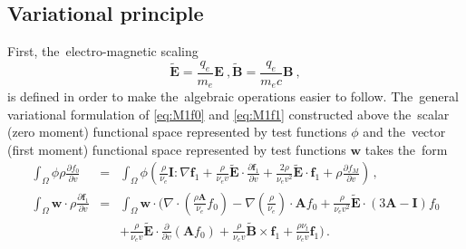\documentclass[review]{elsarticle}
\newcommand{\pdv}[2]{\frac{\partial{#1}}{\partial{#2}}}
\newcommand{\vect}[1]{\boldsymbol{#1}}
\newcommand{\matr}[1]{\mathbf{#1}}
\newcommand{\nue}{\nu_{e}}
\newcommand{\nutot}{\nu_{t}}
\newcommand{\vmag}{v}
\newcommand{\E}{\vect{E}}
\newcommand{\B}{\vect{B}}
\newcommand{\tE}{\vect{\tilde{E}}}
\newcommand{\tB}{\vect{\tilde{B}}}
\newcommand{\qe}{q_e}
\newcommand{\me}{m_e}
\newcommand{\fM}{f_M}
\newcommand{\fzero}{f_0}
\newcommand{\fone}{\vect{f}_1}
\newcommand{\MI}{\matr{I}}
\newcommand{\MA}{\matr{A}}
\newcommand{\intO}{\int_{\Omega}}
\begin{document}
\subsection{Variational principle}
First, the~electro-magnetic scaling
\begin{equation}
  \tE = \frac{\qe}{\me}\E~, \tB = \frac{\qe}{\me c} \B~,
\end{equation}
is defined in order to make the~algebraic operations easier to follow.
The~general variational formulation of \eqref{eq:M1f0} and \eqref{eq:M1f1} 
constructed above the~scalar (zero moment) functional space
represented by test functions $\phi$ and the~vector
(first moment) functional space represented by test functions $\vect{w}$ 
takes the~form
\begin{eqnarray}
  \intO\phi\rho \pdv{\fzero}{\vmag} &=& 
  \intO\phi
  \left(\frac{\rho}{\nue}\MI:\nabla\fone + 
  \frac{\rho}{\nue\vmag}\tE\cdot\pdv{\fone}{\vmag}
  + \frac{2 \rho}{\nue\vmag^2}\tE\cdot\fone + \rho \pdv{\fM}{\vmag}\right)\, , 
  \label{eq:M1hosf0_variational}\\
  \intO\vect{w}\cdot\rho \pdv{\fone}{\vmag} &=&
  \intO\vect{w}\cdot\Bigg(\nabla\cdot\left(\frac{\rho\MA}{\nue}\fzero\right) 
  - \nabla\left( \frac{\rho}{\nue}\right)\cdot\MA\fzero 
  + \frac{\rho}{\nue\vmag^2}\tE\cdot\left( 3\MA - \MI \right)\fzero
  \nonumber\\
  && 
  + \frac{\rho}{\nue\vmag}\tE\cdot\pdv{}{\vmag}
  \left( \MA\fzero\right) + \frac{\rho}{\nue\vmag}\tB\times\fone + 
  \frac{\rho \nutot}{\nue\vmag}\fone\Bigg)\, .
  \label{eq:M1hosf1_variational}
\end{eqnarray}
\end{document}
